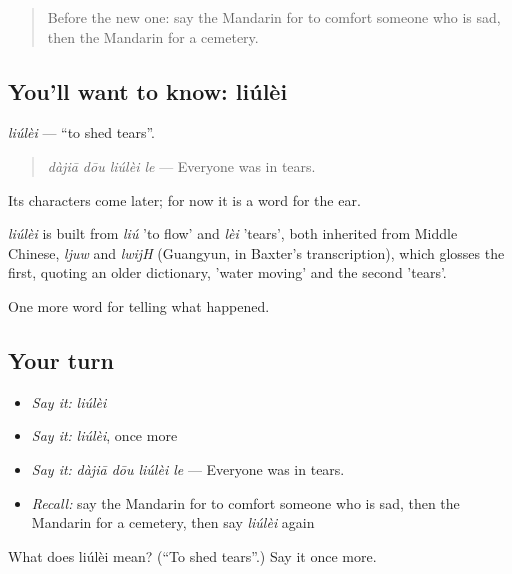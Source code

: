 \begin{quote}
Before the new one: say the Mandarin for to comfort someone who is sad, then the Mandarin for a cemetery.
\end{quote}

\subsection*{You'll want to know: liúlèi}
\emph{liúlèi} — \textquotedblleft{}to shed tears\textquotedblright{}.

\begin{quote}
\emph{dàjiā dōu liúlèi le} — Everyone was in tears.
\end{quote}

Its characters come later; for now it is a word for the ear.

\begin{cousinweb}
\emph{liúlèi} is built from \emph{liú} 'to flow' and \emph{lèi} 'tears', both inherited from Middle Chinese, \emph{ljuw} and \emph{lwijH} (Guangyun, in Baxter's transcription), which glosses the first, quoting an older dictionary, 'water moving' and the second 'tears'.
\end{cousinweb}

\begin{grammarlens}[title={What you've built}]
One more word for telling what happened.
\end{grammarlens}

\subsection*{Your turn}
\begin{itemize}
\raggedright
  \item \emph{Say it:} \emph{liúlèi}
  \item \emph{Say it:} \emph{liúlèi}, once more
  \item \emph{Say it:} \emph{dàjiā dōu liúlèi le} — Everyone was in tears.
  \item \emph{Recall:} say the Mandarin for to comfort someone who is sad, then the Mandarin for a cemetery, then say \emph{liúlèi} again
\end{itemize}

\begin{tcolorbox}[breakable,colback=teal!4,colframe=teal!35!black,title={Before you move on}]
What does liúlèi mean? (\textquotedblleft{}To shed tears\textquotedblright{}.) Say it once more.
\end{tcolorbox}
